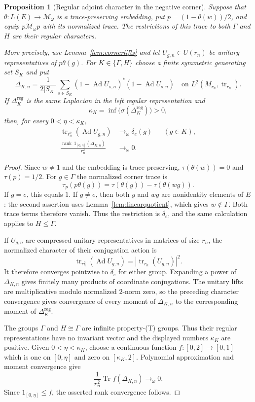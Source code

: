\documentclass[11pt]{article}
\newtheorem{proposition}[theorem]{Proposition}
\theoremstyle{definition}
\theoremstyle{remark}
\newcommand{\Ad}{\operatorname{Ad}}
\newcommand{\tr}{\operatorname{tr}}
\newcommand{\rank}{\operatorname{rank}}
\newcommand{\Tr}{\operatorname{Tr}}
\begin{document}
\begin{proposition}[Regular adjoint character in the negative corner]
\label{prop:cornerregular}
Suppose that $\theta:L(E)\to\mathcal M_\omega$ is a trace-preserving
embedding, put $p=(1-\theta(w))/2$, and equip $p\mathcal M_\omega p$ with
its normalized trace.  The restrictions of this trace to both $\Gamma$ and
$H$ are their regular characters.

More precisely, use Lemma~\ref{lem:cornerlifts} and let $U_{g,n}\in U(r_n)$
be unitary representatives of $p\theta(g)$.  For
$K\in\{\Gamma,H\}$ choose a finite symmetric generating set $S_K$ and put
\[
 \Delta_{K,n}
 =\frac1{2|S_K|}\sum_{s\in S_K}
   (1-\Ad U_{s,n})^*(1-\Ad U_{s,n})
 \quad\text{on }L^2(M_{r_n},\tr_{r_n}).
\]
If $\Delta_K^{\mathrm{reg}}$ is the same Laplacian in the left regular
representation and
\[
 \kappa_K=\inf\bigl(\sigma(\Delta_K^{\mathrm{reg}})\bigr)>0,
\]
then, for every $0<\eta<\kappa_K$,
\begin{align*}
 \tr_{r_n^2}(\Ad U_{g,n})&\longrightarrow_\omega\delta_e(g)
   &&(g\in K),\\
 \frac{\rank\,1_{[0,\eta]}(\Delta_{K,n})}{r_n^2}
   &\longrightarrow_\omega0.&
\end{align*}
\end{proposition}

\begin{proof}
Since $w\ne1$ and the embedding is trace preserving, $\tau(\theta(w))=0$
and $\tau(p)=1/2$.  For $g\in\Gamma$ the normalized corner trace is
\[
 \tau_p(p\theta(g))
 =\tau(\theta(g))-\tau(\theta(wg)).
\]
If $g=e$, this equals $1$.  If $g\ne e$, then both $g$ and $wg$ are
nonidentity elements of $E$: the second assertion uses
Lemma~\ref{lem:linearquotient}, which gives $w\notin\Gamma$.  Both trace
terms therefore vanish.  Thus the restriction is $\delta_e$, and the same
calculation applies to $H\le\Gamma$.

If $U_{g,n}$ are compressed unitary representatives in matrices of size
$r_n$, the normalized character of their conjugation action is
\[
 \tr_{r_n^2}(\Ad U_{g,n})
 =\left|\tr_{r_n}(U_{g,n})\right|^2.
\]
It therefore converges pointwise to $\delta_e$ for either group.  Expanding
a power of $\Delta_{K,n}$ gives finitely many products of coordinate
conjugations.  The unitary lifts are multiplicative modulo normalized
$2$-norm zero, so the preceding character convergence gives convergence of
every moment of $\Delta_{K,n}$ to the corresponding moment of
$\Delta_K^{\mathrm{reg}}$.

The groups $\Gamma$ and $H\cong\Gamma$ are infinite property-(T) groups.
Thus their regular representations have no invariant vector and the
displayed numbers $\kappa_K$ are positive.  Given $0<\eta<\kappa_K$, choose
a continuous function $f:[0,2]\to[0,1]$ which is one on $[0,\eta]$ and
zero on $[\kappa_K,2]$.  Polynomial approximation and moment convergence
give
\[
 \frac{1}{r_n^2}\Tr f(\Delta_{K,n})\longrightarrow_\omega0.
\]
Since $1_{[0,\eta]}\le f$, the asserted rank convergence follows.
\end{proof}
\end{document}
